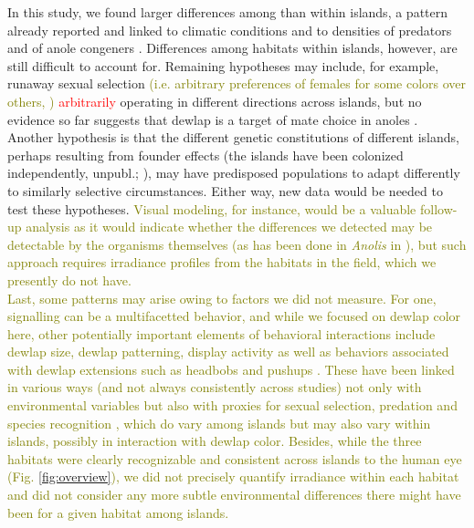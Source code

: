 In this study, we found larger differences among than within islands, a pattern already reported and linked to climatic conditions \citep{Driessens2017} and to densities of predators and of anole congeners \citep{Vanhooydonck2009, Baeckens2018}. Differences among habitats within islands, however, are still difficult to account for. Remaining hypotheses may include, for example, runaway sexual selection \textcolor{olive}{(i.e. arbitrary preferences of females for some colors over others, \citealt{Andersson1994})} \textcolor{red}{arbitrarily} operating in different directions across islands, but no evidence so far suggests that dewlap is a target of mate choice in anoles \citep{Tokarz2002, Tokarz2005, Lailvaux2006, Nicholson2007}. Another hypothesis is that the different genetic constitutions of different islands, perhaps resulting from founder effects (the islands have been colonized independently, \citealt{vandeSchoot2016} unpubl.; \citealt{Driessens2017, Reynolds2020}), may have predisposed populations to adapt differently to similarly selective circumstances. Either way, new data would be needed to test these hypotheses. \textcolor{olive}{Visual modeling, for instance, would be a valuable follow-up analysis as it would indicate whether the differences we detected may be detectable by the organisms themselves (as has been done in \textit{Anolis} in \citealt{Leal2004, Fleishman2020}), but such approach requires irradiance profiles from the habitats in the field, which we presently do not have.}\\

\textcolor{olive}{Last, some patterns may arise owing to factors we did not measure. For one, signalling can be a multifacetted behavior, and while we focused on dewlap color here, other potentially important elements of behavioral interactions include dewlap size, dewlap patterning, display activity as well as behaviors associated with dewlap extensions such as headbobs and pushups \citep{Vanhooydonck2005, Driessens2014, Driessens2015, Lailvaux2015}. These have been linked in various ways (and not always consistently across studies) not only with environmental variables but also with proxies for sexual selection, predation and species recognition \citep{Vanhooydonck2005, Lailvaux2007, Vanhooydonck2009, Driessens2017, Baeckens2018}, which do vary among islands but may also vary within islands, possibly in interaction with dewlap color. Besides, while the three habitats were clearly recognizable and consistent across islands to the human eye (Fig. \ref{fig:overview}), we did not precisely quantify irradiance within each habitat and did not consider any more subtle environmental differences there might have been for a given habitat among islands.}\\

